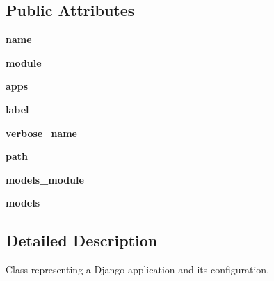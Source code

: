 \subsection*{Public Attributes}
\begin{DoxyCompactItemize}
\item 
\mbox{\label{classdjango_1_1apps_1_1config_1_1_app_config_a14e7d4f79434a7512d810bfd16889822}} 
{\bfseries name}
\item 
\mbox{\label{classdjango_1_1apps_1_1config_1_1_app_config_ac51ed36819b71a43f45d14893ceccd1a}} 
{\bfseries module}
\item 
\mbox{\label{classdjango_1_1apps_1_1config_1_1_app_config_ac2be96b3fff126072f4d065c1ed6db82}} 
{\bfseries apps}
\item 
\mbox{\label{classdjango_1_1apps_1_1config_1_1_app_config_a8638c0a22b40c1fe5e05d092910d3519}} 
{\bfseries label}
\item 
\mbox{\label{classdjango_1_1apps_1_1config_1_1_app_config_af2af13f76676a8d2ee7dae7243e81f68}} 
{\bfseries verbose\+\_\+name}
\item 
\mbox{\label{classdjango_1_1apps_1_1config_1_1_app_config_acf4447ec99336615a191bc64d69120fd}} 
{\bfseries path}
\item 
\mbox{\label{classdjango_1_1apps_1_1config_1_1_app_config_a01c7379f747a3d3cd73a92ae4167ec28}} 
{\bfseries models\+\_\+module}
\item 
\mbox{\label{classdjango_1_1apps_1_1config_1_1_app_config_ae6d48cbf7243b8217affac844c8aac13}} 
{\bfseries models}
\end{DoxyCompactItemize}


\subsection{Detailed Description}
\begin{DoxyVerb}Class representing a Django application and its configuration.\end{DoxyVerb}
 


